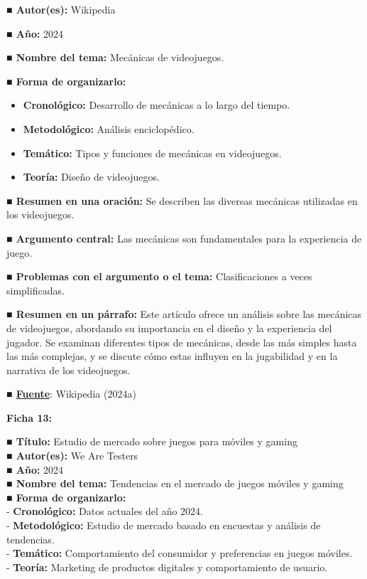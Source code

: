 \documentclass[
  letterpaper,
  DIV=11,
  numbers=noendperiod]{scrreprt}
\begin{document}
\textbf{■ Autor(es):} Wikipedia

\textbf{■ Año:} 2024

\textbf{■ Nombre del tema:} Mecánicas de videojuegos.

\textbf{■ Forma de organizarlo:}

\begin{itemize}
\item
  \textbf{Cronológico:} Desarrollo de mecánicas a lo largo del tiempo.
\item
  \textbf{Metodológico:} Análisis enciclopédico.
\item
  \textbf{Temático:} Tipos y funciones de mecánicas en videojuegos.
\item
  \textbf{Teoría:} Diseño de videojuegos.
\end{itemize}

\textbf{■ Resumen en una oración:} Se describen las diversas mecánicas
utilizadas en los videojuegos.

\textbf{■ Argumento central:} Las mecánicas son fundamentales para la
experiencia de juego.

\textbf{■ Problemas con el argumento o el tema:} Clasificaciones a veces
simplificadas.

\textbf{■ Resumen en un párrafo:} Este artículo ofrece un análisis sobre
las mecánicas de videojuegos, abordando su importancia en el diseño y la
experiencia del jugador. Se examinan diferentes tipos de mecánicas,
desde las más simples hasta las más complejas, y se discute cómo estas
influyen en la jugabilidad y en la narrativa de los videojuegos.

\textbf{■
\href{https://en.wikipedia.org/wiki/Video_game_mechanics}{Fuente}}:
Wikipedia (2024a)

\textbf{Ficha 13:}

\textbf{■ Título:} Estudio de mercado sobre juegos para móviles y
gaming\\
\textbf{■ Autor(es):} We Are Testers\\
\textbf{■ Año:} 2024\\
\textbf{■ Nombre del tema:} Tendencias en el mercado de juegos móviles y
gaming\\
\textbf{■ Forma de organizarlo:}\\
- \textbf{Cronológico:} Datos actuales del año 2024.\\
- \textbf{Metodológico:} Estudio de mercado basado en encuestas y
análisis de tendencias.\\
- \textbf{Temático:} Comportamiento del consumidor y preferencias en
juegos móviles.\\
- \textbf{Teoría:} Marketing de productos digitales y comportamiento de
usuario.
\end{document}
